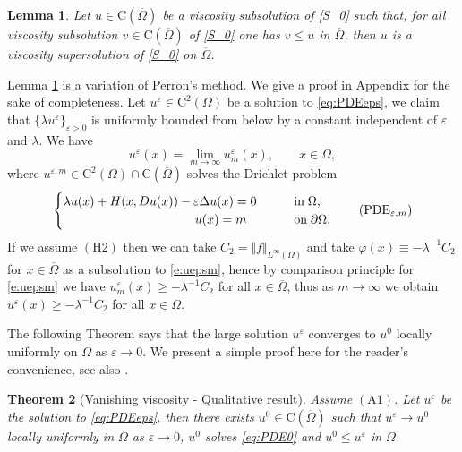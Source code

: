 \documentclass[11pt,reqno]{amsart}
\numberwithin{figure}{section}
\theoremstyle{plain}
\newtheorem{thm}{Theorem}[section]
\newtheorem{lem}[thm]{Lemma}
\theoremstyle{remark}
\numberwithin{equation}{section}
\newcommand{\rmC}{\mathrm{C}}
\begin{document}
\begin{lem}\label{lem:max} Let $u\in \rmC(\overline{\Omega})$ be a viscosity subsolution of \eqref{S_0} such that, for all viscosity subsolution $v\in \rmC(\overline{\Omega})$ of \eqref{S_0} one has $v\leq u$ in $\overline{\Omega}$, then $u$ is a viscosity supersolution of \eqref{S_0} on $\overline{\Omega}$.
\end{lem}
\noindent Lemma \ref{lem:max} is a variation of Perron's method. We give a proof in Appendix for the sake of completeness. Let $u^\varepsilon\in \mathrm{C}^2(\Omega)$ be a solution to \eqref{eq:PDEeps}, we claim that $\{\lambda u^\varepsilon\}_{\varepsilon>0}$ is uniformly bounded from below by a constant independent of $\varepsilon$ and $\lambda$. We have
\begin{equation*}
    u^\varepsilon(x) = \lim_{m\to \infty} u^{\varepsilon}_m(x), \qquad x\in \Omega,
\end{equation*}
 where $u^{\varepsilon,m}\in \mathrm{C}^2(\Omega)\cap \rmC(\overline{\Omega})$ solves the Drichlet problem
\begin{equation}\label{e:uepsm}
    \begin{cases}
    \lambda u(x) + H(x,Du(x)) - \varepsilon \Delta u(x) = 0 &\qquad
    \text{in}\;\Omega, \vspace{0cm}\\
    \;\;\quad\quad\qquad\qquad\qquad\qquad u(x) = m &\qquad
    \text{on}\;\partial\Omega.
    \end{cases} \tag{PDE$_{\varepsilon,m}$}
\end{equation}
If we assume $\mathrm{(H2)}$ then we can take $C_2 = \Vert f\Vert_{L^\infty(\Omega)}$ and take $\varphi(x) \equiv -\lambda^{-1}C_2$ for $x\in \overline{\Omega}$ as a subsolution to \eqref{e:uepsm}, hence by comparison principle for \eqref{e:uepsm} we have $u^{\varepsilon}_m(x)\geq -\lambda^{-1}C_2$ for all $x\in \overline{\Omega}$, thus as $m\to \infty$ we obtain $u^\varepsilon(x) \geq -\lambda^{-1}C_2$ for all $x\in \Omega$.

The following Theorem says that the large solution $u^\varepsilon$ converges to $u^0$ locally uniformly on $\Omega$ as $\varepsilon\to 0$. We present a simple proof here for the reader's convenience, see also \cite[Theorem VII.3]{Capuzzo-Dolcetta1990}.
\begin{thm}[Vanishing viscosity - Qualitative result]\label{thm:qual} Assume $\mathrm{(A1)}$. Let $u^\varepsilon$ be the solution to \eqref{eq:PDEeps}, then there exists $u^0 \in \mathrm{C}(\overline{\Omega})$ such that $u^\varepsilon \rightarrow u^0$ locally uniformly in $\Omega$ as $\varepsilon\rightarrow 0$, $u^0$ solves \eqref{eq:PDE0} and $u^0 \leq u^\varepsilon$ in $\Omega$.
\end{thm}
\end{document}
